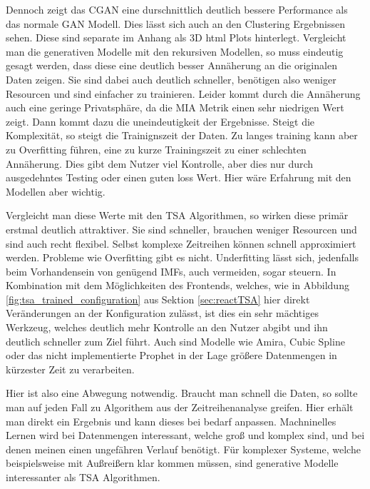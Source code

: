 Dennoch zeigt das \ac{CGAN} eine durschnittlich deutlich bessere Performance als das normale GAN Modell.
Dies lässt sich auch an den Clustering Ergebnissen sehen. Diese sind separate im Anhang als 3D html Plots hinterlegt.
Vergleicht man die generativen Modelle mit den rekursiven Modellen, so muss eindeutig gesagt werden, dass diese eine deutlich besser Annäherung an die originalen Daten zeigen. Sie sind dabei auch deutlich schneller, benötigen also weniger Resourcen und sind einfacher zu trainieren.
Leider kommt durch die Annäherung auch eine geringe Privatsphäre, da die \ac{MIA} Metrik einen sehr niedrigen Wert zeigt.
Dann kommt dazu die uneindeutigkeit der Ergebnisse. Steigt die Komplexität, so steigt die Trainignszeit der Daten. Zu langes training kann aber zu Overfitting führen, eine zu kurze Trainingszeit zu einer schlechten Annäherung. Dies gibt dem Nutzer viel Kontrolle, aber dies nur durch ausgedehntes Testing oder einen guten loss Wert.
Hier wäre Erfahrung mit den Modellen aber wichtig.

Vergleicht man diese Werte mit den \ac{TSA} Algorithmen, so wirken diese primär erstmal deutlich attraktiver. Sie sind schneller, brauchen weniger Resourcen und sind auch recht flexibel. Selbst komplexe Zeitreihen können schnell approximiert werden.
Probleme wie Overfitting gibt es nicht. Underfitting lässt sich, jedenfalls beim Vorhandensein von genügend \ac{IMF}s, auch vermeiden, sogar steuern.
In Kombination mit dem Möglichkeiten des Frontends, welches, wie in Abbildung \ref{fig:tsa_trained_configuration} aus Sektion \ref{sec:reactTSA} hier direkt Veränderungen an der Konfiguration zulässt, ist dies ein sehr mächtiges Werkzeug, welches deutlich mehr Kontrolle an den Nutzer abgibt und ihn deutlich schneller zum Ziel führt.
Auch sind Modelle wie Amira, Cubic Spline oder das nicht implementierte Prophet in der Lage größere Datenmengen in kürzester Zeit zu verarbeiten.

Hier ist also eine Abwegung notwendig. Braucht man schnell die Daten, so sollte man auf jeden Fall zu Algorithem aus der Zeitreihenanalyse greifen. Hier erhält man direkt ein Ergebnis und kann dieses bei bedarf anpassen.
Machninelles Lernen wird bei Datenmengen interessant, welche groß und komplex sind, und bei denen meinen einen ungefähren Verlauf benötigt. 
Für komplexer Systeme, welche beispielsweise mit Außreißern klar kommen müssen, sind generative Modelle interessanter als TSA Algorithmen.

